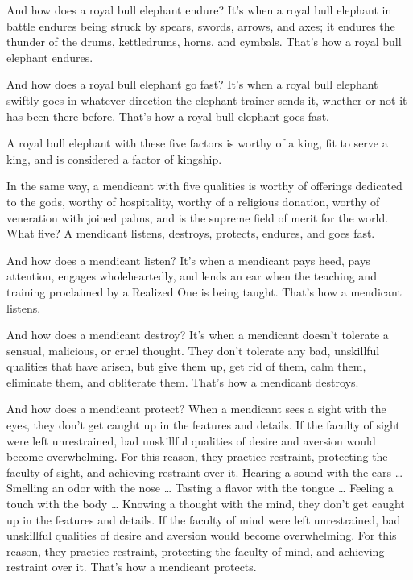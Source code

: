 \documentclass[12pt,openany]{book}%
\begin{document}
And how does a royal bull elephant endure? It’s when a royal bull elephant in battle endures being struck by spears, swords, arrows, and axes; it endures the thunder of the drums, kettledrums, horns, and cymbals. That’s how a royal bull elephant endures. 

And how does a royal bull elephant go fast? It’s when a royal bull elephant swiftly goes in whatever direction the elephant trainer sends it, whether or not it has been there before. That’s how a royal bull elephant goes fast. 

A royal bull elephant with these five factors is worthy of a king, fit to serve a king, and is considered a factor of kingship. 

In the same way, a mendicant with five qualities is worthy of offerings dedicated to the gods, worthy of hospitality, worthy of a religious donation, worthy of veneration with joined palms, and is the supreme field of merit for the world. What five? A mendicant listens, destroys, protects, endures, and goes fast. 

And how does a mendicant listen? It’s when a mendicant pays heed, pays attention, engages wholeheartedly, and lends an ear when the teaching and training proclaimed by a Realized One is being taught. That’s how a mendicant listens. 

And how does a mendicant destroy? It’s when a mendicant doesn’t tolerate a sensual, malicious, or cruel thought. They don’t tolerate any bad, unskillful qualities that have arisen, but give them up, get rid of them, calm them, eliminate them, and obliterate them. That’s how a mendicant destroys. 

And how does a mendicant protect? When a mendicant sees a sight with the eyes, they don’t get caught up in the features and details. If the faculty of sight were left unrestrained, bad unskillful qualities of desire and aversion would become overwhelming. For this reason, they practice restraint, protecting the faculty of sight, and achieving restraint over it. Hearing a sound with the ears … Smelling an odor with the nose … Tasting a flavor with the tongue … Feeling a touch with the body … Knowing a thought with the mind, they don’t get caught up in the features and details. If the faculty of mind were left unrestrained, bad unskillful qualities of desire and aversion would become overwhelming. For this reason, they practice restraint, protecting the faculty of mind, and achieving restraint over it. That’s how a mendicant protects. 
\end{document}
